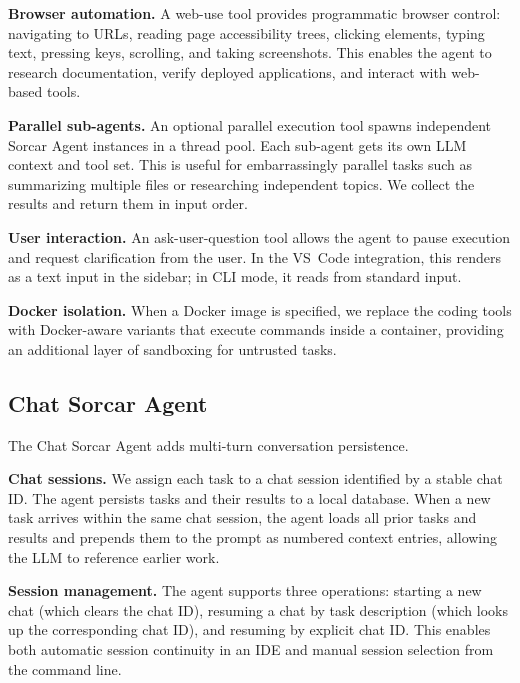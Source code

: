 \documentclass{article}
\begin{document}
\textbf{Browser automation.}  A web-use tool provides programmatic
browser control: navigating to URLs, reading page accessibility trees,
clicking elements, typing text, pressing keys, scrolling, and taking
screenshots.  This enables the agent to research documentation, verify
deployed applications, and interact with web-based tools.

\textbf{Parallel sub-agents.}  An optional parallel execution tool
spawns independent Sorcar Agent instances in a thread pool.  Each
sub-agent gets its own LLM context and tool set.  This is useful for
embarrassingly parallel tasks such as summarizing multiple files or
researching independent topics.  We collect the results and return
them in input order.

\textbf{User interaction.}  An ask-user-question tool allows the agent
to pause execution and request clarification from the user.  In the
VS~Code integration, this renders as a text input in the sidebar; in
CLI mode, it reads from standard input.

\textbf{Docker isolation.}  When a Docker image is specified, we
replace the coding tools with Docker-aware variants that execute
commands inside a container, providing an additional layer of
sandboxing for untrusted tasks.

\subsection{Chat Sorcar Agent}
\label{sec:chat-agent}

The Chat Sorcar Agent adds multi-turn conversation persistence.

\textbf{Chat sessions.}  We assign each task to a chat session
identified by a stable chat ID.  The agent persists tasks and their
results to a local database.  When a new task arrives within the same
chat session, the agent loads all prior tasks and results and prepends
them to the prompt as numbered context entries, allowing the LLM to
reference earlier work.

\textbf{Session management.}  The agent supports three operations:
starting a new chat (which clears the chat ID), resuming a chat by
task description (which looks up the corresponding chat ID), and
resuming by explicit chat ID.  This enables both automatic session
continuity in an IDE and manual session selection from the command
line.
\end{document}
